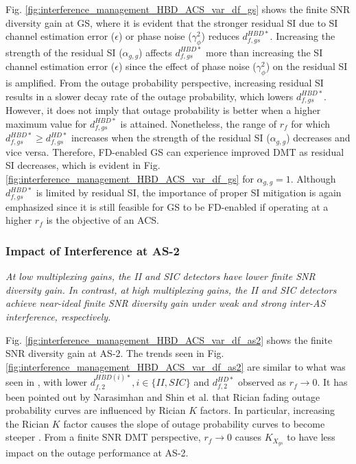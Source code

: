 Fig. \ref{fig:interference_management_HBD_ACS_var_df_gs} shows the finite SNR diversity gain at GS, where it is evident that the stronger residual SI due to SI channel estimation error ($\epsilon$) or phase noise ($\gamma_{\phi}^2$) reduces $d_{f,gs}^{HBD*}$. Increasing the strength of the residual SI ($\alpha_{g,g}$) affects $d_{f,gs}^{HBD*}$ more than increasing the SI channel estimation error ($\epsilon$) since the effect of phase noise ($\gamma_{\phi}^2$) on the residual SI is amplified. From the outage probability perspective, increasing residual SI results in a slower decay rate of the outage probability, which lowers $d_{f,gs}^{HBD*}$. However, it does not imply that outage probability is better when a higher maximum value for $d_{f,gs}^{HBD*}$ is attained. Nonetheless, the range of $r_f$ for which $d_{f,gs}^{HBD*}\geq d_{f,gs}^{HD*}$ increases when the strength of the residual SI ($\alpha_{g,g}$) decreases and vice versa. Therefore, FD-enabled GS can experience improved DMT as residual SI decreases, which is evident in Fig. \ref{fig:interference_management_HBD_ACS_var_df_gs} for $\alpha_{g,g}=1$. Although $d_{f,gs}^{HBD*}$ is limited by residual SI, the importance of proper SI mitigation is again emphasized since it is still feasible for GS to be FD-enabled if operating at a higher $r_f$ is the objective of an ACS.

\subsubsection{Impact of Interference at AS-2}

\begin{observation}
\emph{\emph{At low multiplexing gains, the II and SIC detectors have lower finite SNR diversity gain. In contrast, at high multiplexing gains, the II and SIC detectors achieve near-ideal finite SNR diversity gain under weak and strong inter-AS interference, respectively.}
}\end{observation}

Fig. \ref{fig:interference_management_HBD_ACS_var_df_as2} shows the finite SNR diversity gain at AS-2. The trends seen in Fig. \ref{fig:interference_management_HBD_ACS_var_df_as2} are similar to what was seen in \cite[Fig. 4]{narasimhan2006finite}, with lower $d_{f,2}^{HBD(i)*}, i \in \{II,SIC\}$ and $d_{f,2}^{HD*}$ observed as $r_f \to 0$. It has been pointed out by Narasimhan \cite{narasimhan2006finite} and Shin et al. \cite{shin2008diversity} that Rician fading outage probability curves are influenced by Rician $K$ factors. In particular, increasing the Rician $K$ factor causes the slope of outage probability curves to become steeper \cite[Fig. 2]{shin2008diversity}. From a finite SNR DMT perspective, $r_f \to 0$ causes $K_{X_{gs}}$ to have less impact on the outage performance at AS-2. 

